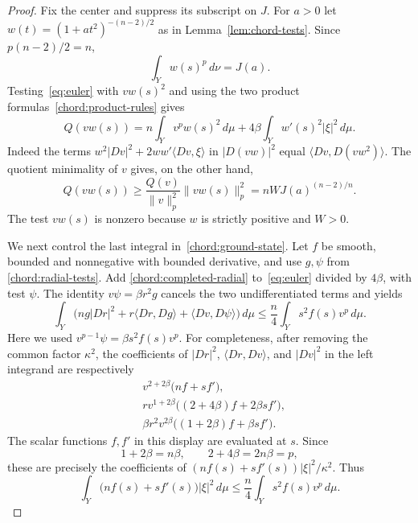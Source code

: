 \documentclass[11pt]{article}
\numberwithin{equation}{section}
\theoremstyle{definition}
\theoremstyle{remark}
\begin{document}
\begin{proof}
Fix the center and suppress its subscript on $J$. For $a>0$ let
$w(t)=(1+at^2)^{-(n-2)/2}$ as in
Lemma~\ref{lem:chord-tests}. Since $p(n-2)/2=n$,
\[
 \int_Y w(s)^p\,d\nu=J(a).
\]
Testing~\eqref{eq:euler} with $vw(s)^2$ and using
the two product formulas~\eqref{chord:product-rules} gives
\begin{equation}\label{chord:ground-state}
 Q(vw(s))
    =n\int_Y v^p w(s)^2\,d\mu
              +4\beta\int_Y w'(s)^2\lvert \xi\rvert^2\,d\mu.
\end{equation}
Indeed the terms $w^2\lvert Dv\rvert^2+2ww'\langle Dv,\xi\rangle$ in
$\lvert D(vw)\rvert^2$ equal $\langle Dv,D(vw^2)\rangle$. The quotient
minimality of $v$ gives, on the other hand,
\begin{equation}\label{chord:quotient}
 Q(vw(s))\ge
   \frac{Q(v)}{\lVert v\rVert_p^2}\lVert vw(s)\rVert_p^2
                   =nW J(a)^{(n-2)/n}.
\end{equation}
The test $vw(s)$ is nonzero because $w$ is strictly positive
and $W>0$.

We next control the last integral
in~\eqref{chord:ground-state}. Let $f$ be smooth, bounded and
nonnegative with bounded derivative, and use $g,\psi$ from
\eqref{chord:radial-tests}. Add
\eqref{chord:completed-radial} to~\eqref{eq:euler} divided by
$4\beta$, with test $\psi$. The identity
$v\psi=\beta r^2g$ cancels the two undifferentiated terms and
yields
\begin{equation}\label{chord:added-tests}
 \int_Y\bigl(ng\lvert Dr\rvert^2+r\langle Dr,Dg\rangle
                              +\langle Dv,D\psi\rangle\bigr)\,d\mu
       \le\frac n4\int_Y s^2f(s)v^p\,d\mu.
\end{equation}
Here we used
$v^{p-1}\psi=\beta s^2f(s)v^p$.
For completeness, after removing the common factor $\kappa^2$,
the coefficients of $\lvert Dr\rvert^2$, $\langle Dr,Dv\rangle$, and
$\lvert Dv\rvert^2$ in the left integrand are respectively
\begin{align*}
 &v^{2+2\beta}\bigl(nf+sf'\bigr),\\
 &r v^{1+2\beta}\bigl((2+4\beta)f+2\beta sf'\bigr),\\
 &\beta r^2v^{2\beta}\bigl((1+2\beta)f+\beta sf'\bigr).
\end{align*}
The scalar functions $f,f'$ in this display are evaluated at
$s$. Since
\begin{equation}\label{chord:exponent-identities}
 1+2\beta=n\beta,\qquad 2+4\beta=2n\beta=p,
\end{equation}
these are precisely the coefficients of
$(nf(s)+sf'(s))\lvert \xi\rvert^2/\kappa^2$. Thus
\begin{equation}\label{chord:energy}
 \int_Y\bigl(nf(s)+sf'(s)\bigr)\lvert \xi\rvert^2\,d\mu
               \le\frac n4\int_Ys^2f(s)v^p\,d\mu.
\end{equation}


\end{proof}
\end{document}
